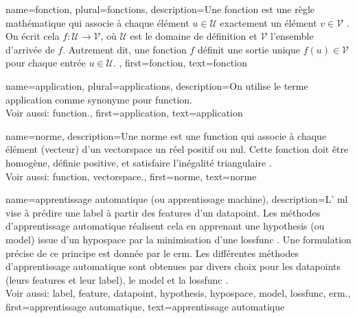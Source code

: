 
\newcommand{\gaussiancenter}{3}

{name={fonction}, plural={fonctions}, 
	description={Une fonction est une règle mathématique qui associe à chaque élément $u \in \mathcal{U}$ exactement un élément $v \in \mathcal{V}$ \cite{RudinBookPrinciplesMatheAnalysis}. 
		On écrit cela $f: \mathcal{U} \rightarrow \mathcal{V}$, où $\mathcal{U}$ est le domaine de définition
		et $\mathcal{V}$ l'ensemble d'arrivée de $f$. Autrement dit, une fonction $f$ définit une sortie unique 
		$f(u) \in \mathcal{V}$ pour chaque entrée $u \in \mathcal{U}$.
	},
	first={fonction},
	text={fonction} 
}

{name={application}, plural={applications}, 
	description={On utilise le terme application comme synonyme pour \gls{function}.
		\\
		Voir aussi: \gls{function}.},
	first={application},
	text={application}
}

{name={norme},
	description={Une norme est une \gls{function} qui associe à chaque élément (vecteur) d’un \gls{vectorspace} un réel positif ou nul. Cette fonction doit être homogène, définie positive, et satisfaire l’inégalité triangulaire \cite{HornMatAnalysis}.
		\\
		Voir aussi: \gls{function}, \gls{vectorspace}.},
	first={norme}, text={norme}
}

{name={apprentissage automatique (ou apprentissage machine)},
	description={L’ \gls{ml} vise à prédire une \gls{label} à partir des \glspl{feature} d’un \gls{datapoint}. Les méthodes d’apprentissage automatique réalisent cela en apprenant une \gls{hypothesis} (ou \gls{model}) issue d’un \gls{hypospace} par la minimisation d’une \gls{lossfunc} \cite{MLBasics,HastieWainwrightBook}. Une formulation précise de ce principe est donnée par le \gls{erm}. Les différentes méthodes d’apprentissage automatique sont obtenues par divers choix pour les \glspl{datapoint} (leurs \glspl{feature} et leur \gls{label}), le \gls{model} et la \gls{lossfunc} \cite[Ch. 3]{MLBasics}.
		\\ 
		Voir aussi: \gls{label}, \gls{feature}, \gls{datapoint}, \gls{hypothesis}, \gls{hypospace}, \gls{model}, \gls{lossfunc}, \gls{erm}.},
	first={apprentissage automatique}, text={apprentissage automatique}
}

